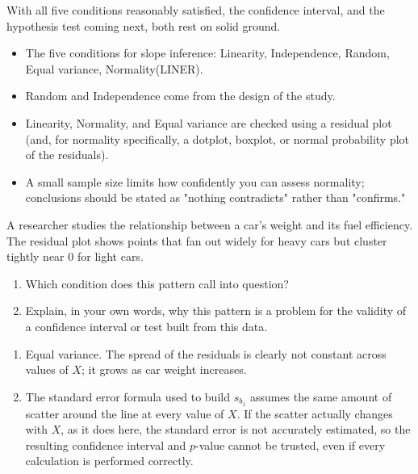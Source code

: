 With all five conditions reasonably satisfied, the confidence interval, and the hypothesis test coming next, both rest on solid ground.

\begin{itemize}
    \item The five conditions for slope inference: Linearity, Independence, Random, Equal variance, Normality(LINER).
    \item Random and Independence come from the design of the study.
    \item Linearity, Normality, and Equal variance are checked using a residual plot (and, for normality specifically, a dotplot, boxplot, or normal probability plot of the residuals).
    \item A small sample size limits how confidently you can assess normality; conclusions should be stated as "nothing contradicts" rather than "confirms."
\end{itemize}

\begin{Exercise}[title={Diagnosing a Residual Plot}, label={ex:slope-cond-1}]
A researcher studies the relationship between a car's weight and its fuel efficiency. The residual plot shows points that fan out widely for heavy cars but cluster tightly near $0$ for light cars.
\begin{enumerate}
    \item Which condition does this pattern call into question?
    \item Explain, in your own words, why this pattern is a problem for the validity of a confidence interval or test built from this data.
\end{enumerate}
\end{Exercise}

\begin{Answer}[ref={ex:slope-cond-1}]
\begin{enumerate}
    \item Equal variance. The spread of the residuals is clearly not constant across values of $X$; it grows as car weight increases.
    \item The standard error formula used to build $s_{b_1}$ assumes the same amount of scatter around the line at every value of $X$. If the scatter actually changes with $X$, as it does here, the standard error is not accurately estimated, so the resulting confidence interval and $p$-value cannot be trusted, even if every calculation is performed correctly.
\end{enumerate}
\end{Answer}

